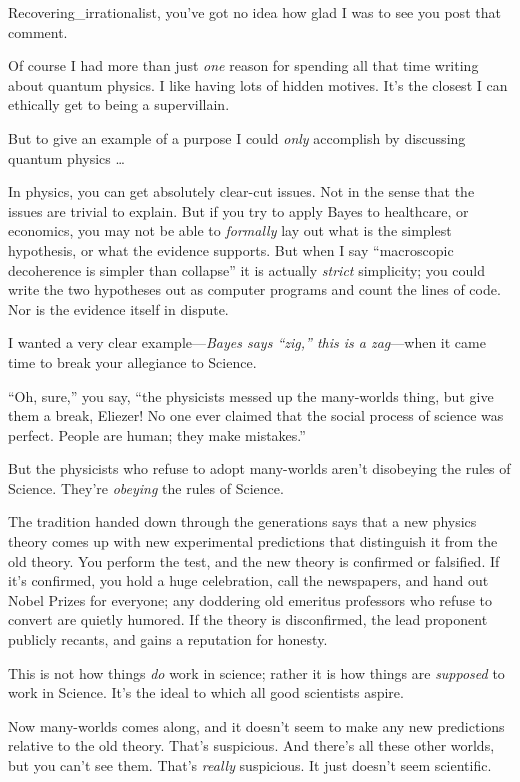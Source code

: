 {
 Recovering\_irrationalist, you've got no idea how
glad I was to see you post that comment.}

{
 Of course I had more than just \textit{one} reason for spending
all that time writing about quantum physics. I like having lots of
hidden motives. It's the closest I can ethically get to
being a supervillain.}

{
 But to give an example of a purpose I could \textit{only}
accomplish by discussing quantum physics \ldots}

{
 In physics, you can get absolutely clear-cut issues. Not in the
sense that the issues are trivial to explain. But if you try to apply
Bayes to healthcare, or economics, you may not be able to
\textit{formally} lay out what is the simplest hypothesis, or what the
evidence supports. But when I say ``macroscopic
decoherence is simpler than collapse'' it is actually
\textit{strict} simplicity; you could write the two hypotheses out as
computer programs and count the lines of code. Nor is the evidence
itself in dispute.}

{
 I wanted a very clear example---\textit{Bayes says
``zig,'' this is a zag}{}---when it
came time to break your allegiance to Science.}

{
 ``Oh, sure,'' you say,
``the physicists messed up the many-worlds thing, but
give them a break, Eliezer! No one ever claimed that the social process
of science was perfect. People are human; they make
mistakes.''}

{
 But the physicists who refuse to adopt many-worlds
aren't disobeying the rules of Science.
They're \textit{obeying} the rules of Science.}

{
 The tradition handed down through the generations says that a new
physics theory comes up with new experimental predictions that
distinguish it from the old theory. You perform the test, and the new
theory is confirmed or falsified. If it's confirmed,
you hold a huge celebration, call the newspapers, and hand out Nobel
Prizes for everyone; any doddering old emeritus professors who refuse
to convert are quietly humored. If the theory is disconfirmed, the lead
proponent publicly recants, and gains a reputation for honesty.}

{
 This is not how things \textit{do} work in science; rather it is
how things are \textit{supposed} to work in Science.
It's the ideal to which all good scientists aspire.}

{
 Now many-worlds comes along, and it doesn't seem
to make any new predictions relative to the old theory.
That's suspicious. And there's all
these other worlds, but you can't see them.
That's \textit{really} suspicious. It just
doesn't seem scientific.}


